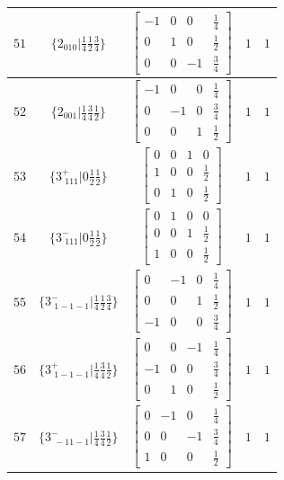\documentclass[fleqn,8pt]{jsarticle}
\begin{document}
\begin{longtable}{ccccc}
$ 51 $ & $ \{2{}_{010}|\frac{1}{4} \frac{1}{2} \frac{3}{4}\} $ & $ \begin{bmatrix} -1 & 0 & 0 & \frac{1}{4} \\ 0 & 1 & 0 & \frac{1}{2} \\ 0 & 0 & -1 & \frac{3}{4} \end{bmatrix} $ & $ 1 $ & $ 1 $ \\ \hline
$ 52 $ & $ \{2{}_{001}|\frac{1}{4} \frac{3}{4} \frac{1}{2}\} $ & $ \begin{bmatrix} -1 & 0 & 0 & \frac{1}{4} \\ 0 & -1 & 0 & \frac{3}{4} \\ 0 & 0 & 1 & \frac{1}{2} \end{bmatrix} $ & $ 1 $ & $ 1 $ \\ \hline
$ 53 $ & $ \{3^{+}_{\,\,111}|0 \frac{1}{2} \frac{1}{2}\} $ & $ \begin{bmatrix} 0 & 0 & 1 & 0 \\ 1 & 0 & 0 & \frac{1}{2} \\ 0 & 1 & 0 & \frac{1}{2} \end{bmatrix} $ & $ 1 $ & $ 1 $ \\ \hline
$ 54 $ & $ \{3^{-}_{\,\,111}|0 \frac{1}{2} \frac{1}{2}\} $ & $ \begin{bmatrix} 0 & 1 & 0 & 0 \\ 0 & 0 & 1 & \frac{1}{2} \\ 1 & 0 & 0 & \frac{1}{2} \end{bmatrix} $ & $ 1 $ & $ 1 $ \\ \hline
$ 55 $ & $ \{3^{-}_{\,\,1-1-1}|\frac{1}{4} \frac{1}{2} \frac{3}{4}\} $ & $ \begin{bmatrix} 0 & -1 & 0 & \frac{1}{4} \\ 0 & 0 & 1 & \frac{1}{2} \\ -1 & 0 & 0 & \frac{3}{4} \end{bmatrix} $ & $ 1 $ & $ 1 $ \\ \hline
$ 56 $ & $ \{3^{+}_{\,\,1-1-1}|\frac{1}{4} \frac{3}{4} \frac{1}{2}\} $ & $ \begin{bmatrix} 0 & 0 & -1 & \frac{1}{4} \\ -1 & 0 & 0 & \frac{3}{4} \\ 0 & 1 & 0 & \frac{1}{2} \end{bmatrix} $ & $ 1 $ & $ 1 $ \\ \hline
$ 57 $ & $ \{3^{-}_{\,\,-11-1}|\frac{1}{4} \frac{3}{4} \frac{1}{2}\} $ & $ \begin{bmatrix} 0 & -1 & 0 & \frac{1}{4} \\ 0 & 0 & -1 & \frac{3}{4} \\ 1 & 0 & 0 & \frac{1}{2} \end{bmatrix} $ & $ 1 $ & $ 1 $ \\ \hline

\end{longtable}
\end{document}
